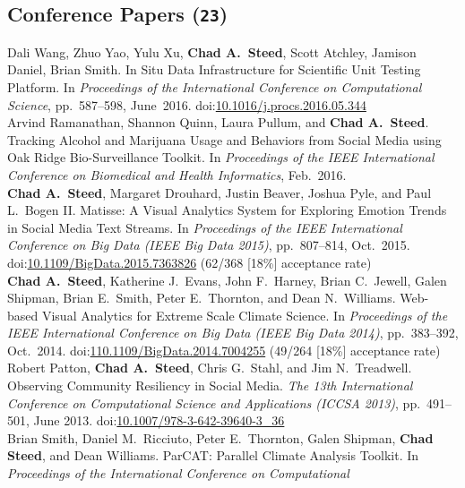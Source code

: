 \documentclass[11pt, letterpaper]{article}
\newcommand{\years}[1]{\marginnote{\scriptsize #1}}
\begin{document}
\subsection*{Conference Papers (\texttt{23})}
\begin{sloppypar}
\noindent\years{2016}Dali Wang, Zhuo Yao, Yulu Xu, \textbf{Chad A.\ Steed},
Scott Atchley, Jamison Daniel, Brian Smith. In Situ Data Infrastructure for
Scientific Unit Testing Platform.
In \emph{Proceedings of the International Conference on Computational Science},
pp.\ 587--598, June\ 2016. doi:\href{http://dx.doi.org/10.1016/j.procs.2016.05.344}{10.1016/j.procs.2016.05.344}\\
\years{2016}Arvind Ramanathan, Shannon Quinn, Laura Pullum, and
\textbf{Chad A.\ Steed}. Tracking Alcohol and Marijuana Usage and Behaviors
from Social Media using Oak Ridge Bio-Surveillance Toolkit.
In \emph{Proceedings of the IEEE International Conference on Biomedical and
Health Informatics}, Feb.\ 2016.\\
\years{2015}\textbf{Chad A.\ Steed}, Margaret Drouhard, Justin
Beaver, Joshua Pyle, and Paul L.\ Bogen II. Matisse: A Visual Analytics
System for Exploring Emotion Trends in Social Media Text Streams.
In \emph{Proceedings of the IEEE International Conference on Big Data (IEEE
Big Data 2015)}, pp.\ 807--814, Oct.\ 2015. doi:\href{http://dx.doi.org/10.1109/BigData.2015.7363826}{10.1109/BigData.2015.7363826} (62/368 [18\%] acceptance rate)\\
\years{2014}\textbf{Chad A.\ Steed}, Katherine J.\ Evans, John F.\ Harney,
Brian C.\ Jewell, Galen Shipman, Brian E.\ Smith, Peter E.\ Thornton, and
Dean N.\ Williams. Web-based Visual Analytics for Extreme Scale Climate Science.
In \emph{Proceedings of the IEEE International Conference on Big Data (IEEE Big Data 2014)},
pp.\ 383--392, Oct.\ 2014.
doi:\href{http://dx.doi.org/10.1109/BigData.2014.7004255}{110.1109/BigData.2014.7004255} (49/264 [18\%] acceptance rate)\\
\years{2013}Robert Patton, \textbf{Chad A.\ Steed}, Chris G.\ Stahl, and
Jim N.\ Treadwell. Observing Community Resiliency in Social Media. \emph{The 13th
International Conference on Computational Science and Applications (ICCSA 2013)},
pp.\ 491--501, June 2013.
doi:\href{http://dx.doi.org/10.1007/978-3-642-39640-3\_36}{10.1007/978-3-642-39640-3\_36} \\
\years{2013}Brian Smith, Daniel M.\ Ricciuto, Peter E.\ Thornton, Galen Shipman,
\textbf{Chad Steed}, and Dean Williams. ParCAT: Parallel Climate Analysis Toolkit.
In \emph{Proceedings of the International Conference on Computational
}
\end{sloppypar}
\end{document}
